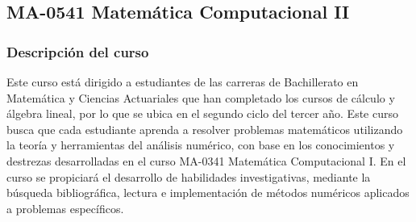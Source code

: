 \newpage

\subsection*{MA-0541 Matemática Computacional II}

\begin{refsection}
\begin{table}[H]
\end{table}



\subsubsection*{Descripción del curso}

Este curso está dirigido a estudiantes de las carreras de Bachillerato en Matemática y Ciencias Actuariales que han completado los cursos de cálculo y álgebra lineal, por lo que se ubica en el segundo ciclo del tercer año. Este curso busca que cada estudiante aprenda a resolver problemas matemáticos utilizando la teoría y herramientas del análisis numérico, con base en los conocimientos y destrezas desarrolladas en el curso MA-0341 Matemática Computacional I. En el curso se propiciará el desarrollo de habilidades investigativas, mediante la búsqueda bibliográfica, lectura e implementación de métodos numéricos aplicados a problemas específicos.


\end{refsection}
